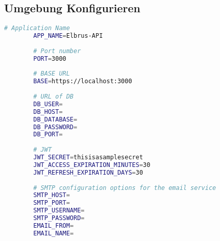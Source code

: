 \documentclass{article}
\begin{document}
	\subsection[file config]{Umgebung Konfigurieren}
	
	\lstset{style=files}
	\begin{lstlisting}[caption={Anhand von '.env.example' eigene '.env' Datei anlegen.}, language=bash]
		# Application Name
		APP_NAME=Elbrus-API
		
		# Port number
		PORT=3000
		
		# BASE URL
		BASE=https://localhost:3000
		
		# URL of DB
		DB_USER=
		DB_HOST=
		DB_DATABASE=
		DB_PASSWORD=
		DB_PORT=
		
		# JWT
		JWT_SECRET=thisisasamplesecret
		JWT_ACCESS_EXPIRATION_MINUTES=30
		JWT_REFRESH_EXPIRATION_DAYS=30
		
		# SMTP configuration options for the email service
		SMTP_HOST=
		SMTP_PORT=
		SMTP_USERNAME=
		SMTP_PASSWORD=
		EMAIL_FROM=
		EMAIL_NAME=
	\end{lstlisting}
	\lstset{style=commands}
\end{document}
